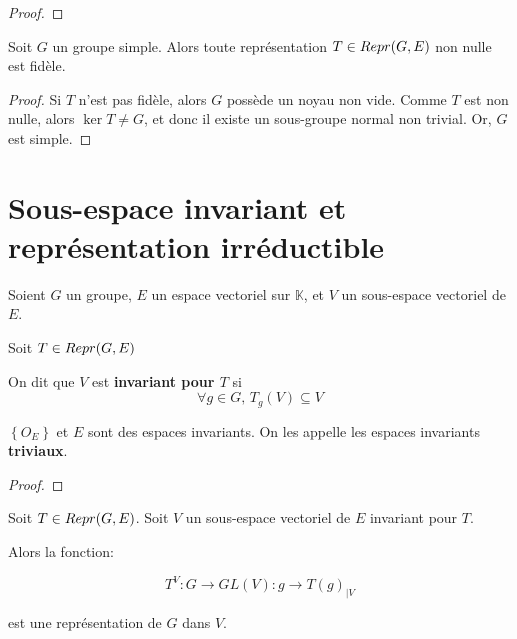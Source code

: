 \begin{proof}

\end{proof}

\begin{corollary}
	Soit $G$ un groupe simple. Alors toute représentation $T \in Repr(G, E)$
	non nulle est fidèle.
\end{corollary}

\begin{proof}
	Si $T$ n'est pas fidèle, alors $G$ possède un noyau non vide. Comme $T$ est
	non nulle, alors $\ker{T} \neq G$, et donc il existe un sous-groupe normal
	non trivial. Or, $G$ est simple.
\end{proof}

\section{Sous-espace invariant et représentation irréductible}

\begin{definition} 
	Soient $G$ un groupe, $E$ un espace vectoriel sur $\mathbb{K}$, et $V$ un sous-espace
	vectoriel de $E$.

	Soit $T \in Repr(G, E)$

	On dit que $V$ est \textbf{invariant pour $T$} si
	\begin{equation}
		\forall g \in G, \, T_{g}(V) \subseteq V
		\label{definition_invariant_subspace}
	\end{equation}
\end{definition}

\begin{proposition}
	$\left\{ O_{E} \right\}$ et $E$ sont des espaces invariants. On les appelle
	les espaces invariants \textbf{triviaux}.
\end{proposition}

\begin{proof}

\end{proof}

\begin{proposition}
	Soit $T \in Repr(G, E)$. Soit $V$ un sous-espace vectoriel de $E$
	invariant pour $T$.

	Alors la fonction:

	\begin{equation}
		T^{V} : G \rightarrow GL(V) : g \rightarrow T(g)_{|V}
	\end{equation}

	est une représentation de $G$ dans $V$.
\end{proposition}

